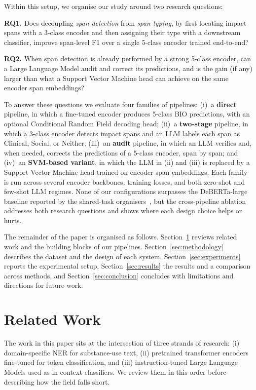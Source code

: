 \documentclass[journal]{IEEEtran}
\begin{document}
Within this setup, we organise our study around two research
questions:

\noindent\textbf{RQ1.} Does decoupling \emph{span detection} from
\emph{span typing}, by first locating impact spans with a 3-class
encoder and then assigning their type with a downstream classifier,
improve span-level F1 over a single 5-class encoder trained
end-to-end?

\noindent\textbf{RQ2.} When span detection is already performed by a
strong 5-class encoder, can a Large Language Model audit and correct
its predictions, and is the gain (if any) larger than what a Support
Vector Machine head can achieve on the same encoder span embeddings?

To answer these questions we evaluate four families of pipelines:
(i)~a \textbf{direct} pipeline, in which a fine-tuned encoder produces
5-class BIO predictions, with an optional Conditional Random Field
decoding head; (ii)~a \textbf{two-stage} pipeline, in which a 3-class
encoder detects impact spans and an LLM labels each span as Clinical,
Social, or Neither; (iii)~an \textbf{audit} pipeline, in which an LLM
verifies and, when needed, corrects the predictions of a 5-class
encoder, span by span; and (iv)~an \textbf{SVM-based variant}, in
which the LLM in (ii) and (iii) is replaced by a Support Vector
Machine head trained on encoder span embeddings. Each family is run
across several encoder backbones, training losses, and both zero-shot
and few-shot LLM regimes. None of our configurations surpasses the
DeBERTa-large baseline reported by the shared-task
organisers~\cite{dey2025inference}, but the cross-pipeline ablation
addresses both research questions and shows where each design choice
helps or hurts.

The remainder of the paper is organised as follows.
Section~\ref{sec:related} reviews related work and the building blocks
of our pipelines. Section~\ref{sec:methodology} describes the dataset
and the design of each system. Section~\ref{sec:experiments} reports
the experimental setup, Section~\ref{sec:results} the results and a
comparison across methods, and Section~\ref{sec:conclusion} concludes
with limitations and directions for future work.

\section{Related Work}
\label{sec:related}
The work in this paper sits at the intersection of three strands of
research: (i) domain-specific NER for substance-use text, (ii)
pretrained transformer encoders fine-tuned for token classification,
and (iii) instruction-tuned Large Language Models used as in-context
classifiers. We review them in this order before describing how the
field falls short.
\end{document}
